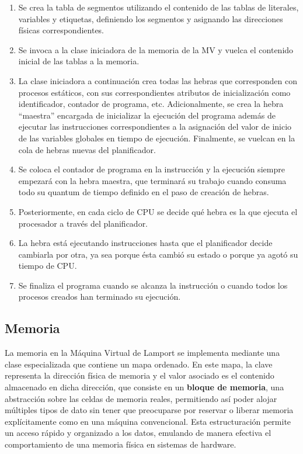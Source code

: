 \begin{enumerate}
    \item Se crea la tabla de segmentos utilizando el contenido de las tablas de literales, variables y etiquetas, definiendo los segmentos y asignando las direcciones físicas correspondientes.
    \item Se invoca a la clase iniciadora de la memoria de la MV y vuelca el contenido inicial de las tablas a la memoria.
    \item La clase iniciadora a continuación crea todas las hebras que corresponden con procesos estáticos, con sus correspondientes atributos de inicialización como identificador, contador de programa, etc. Adicionalmente, se crea la hebra ``maestra'' encargada de inicializar la ejecución del programa además de ejecutar las instrucciones correspondientes a la asignación del valor de inicio de las variables globales en tiempo de ejecución. Finalmente, se vuelcan en la cola de hebras nuevas del planificador. 
    \item Se coloca el contador de programa en la instrucción  y la ejecución siempre empezará con la hebra maestra, que terminará su trabajo cuando consuma todo su quantum de tiempo definido en el paso de creación de hebras.
    \item Posteriormente, en cada ciclo de CPU se decide qué hebra es la que ejecuta el procesador a través del planificador.
    \item La hebra está ejecutando instrucciones hasta que el planificador decide cambiarla por otra, ya sea porque ésta cambió su estado o porque ya agotó su tiempo de CPU.
    \item Se finaliza el programa cuando se alcanza la instrucción  o cuando todos los procesos creados han terminado su ejecución.
\end{enumerate}

\subsection{Memoria}\label{subsec:memoryLVM}
La memoria en la Máquina Virtual de Lamport se implementa mediante una clase especializada que contiene un mapa ordenado. En este mapa, la clave representa la dirección física de memoria y el valor asociado es el contenido almacenado en dicha dirección, que consiste en un \textbf{bloque de memoria}, una abstracción sobre las celdas de memoria reales, permitiendo así poder alojar múltiples tipos de dato sin tener que preocuparse por reservar o liberar memoria explícitamente como en una máquina convencional. Esta estructuración permite un acceso rápido y organizado a los datos, emulando de manera efectiva el comportamiento de una memoria física en sistemas de hardware.

